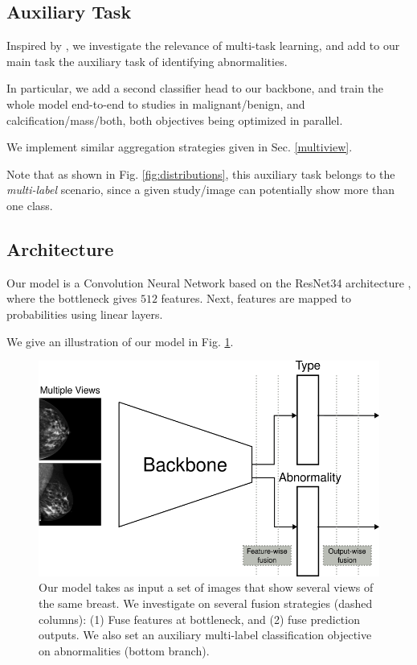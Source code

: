 \documentclass[11pt]{article}
\begin{document}
\subsection{Auxiliary Task}
\label{sec:orgd66358d}

Inspired by \autocite{tardy22}, we investigate the relevance of multi-task learning,
and add to our main task the auxiliary task of identifying
abnormalities.

In particular, we add a second classifier head to our backbone, and train the whole
model end-to-end to studies in malignant/benign, and calcification/mass/both,
both objectives being optimized in parallel.

We implement similar aggregation strategies given in Sec. \ref{multiview}.

Note that as shown in Fig. \ref{fig:distributions}, this auxiliary task belongs to the
\emph{multi-label} scenario, since a given study/image can potentially
show more than one class.

\subsection{Architecture}
\label{sec:orgdabd2a5}

Our model is a Convolution Neural Network based on the ResNet34
architecture \autocite{he15}, where the bottleneck gives \(512\) features.
Next, features are mapped to probabilities using linear layers.

We give an illustration of our model in Fig. \ref{fig:model}.

\begin{figure}[htbp]
\centering
\includegraphics[width=.9\linewidth]{./images/model.png}
\caption{\label{fig:model}Our model takes as input a set of images that show several views of the same breast. We investigate on several fusion strategies (dashed columns): (1) Fuse features at bottleneck, and (2) fuse prediction outputs. We also set an auxiliary multi-label classification objective on abnormalities (bottom branch).}
\end{figure}
\end{document}
